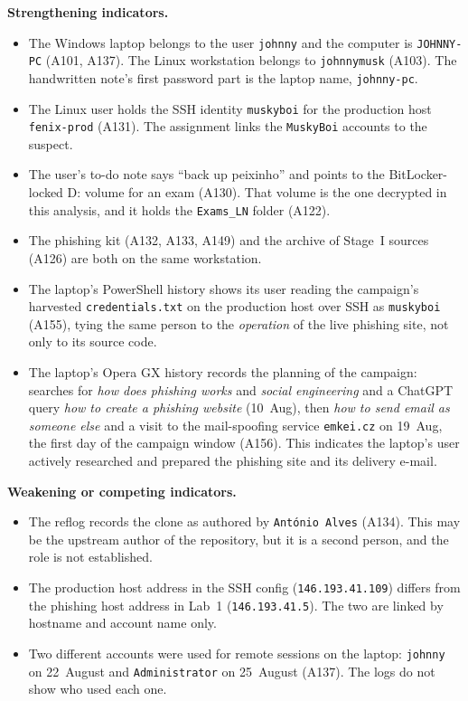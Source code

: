 \documentclass[11pt,a4paper,final,oneside]{article}
\begin{document}
\textbf{Strengthening indicators.}
\begin{itemize}
  \item The Windows laptop belongs to the user \texttt{johnny} and the computer is \texttt{JOHNNY-PC} (A101, A137). The Linux workstation belongs to \texttt{johnnymusk} (A103). The handwritten note's first password part is the laptop name, \texttt{johnny-pc}.
  \item The Linux user holds the SSH identity \texttt{muskyboi} for the production host \texttt{fenix-prod} (A131). The assignment links the \texttt{MuskyBoi} accounts to the suspect.
  \item The user's to-do note says ``back up peixinho'' and points to the BitLocker-locked D: volume for an exam (A130). That volume is the one decrypted in this analysis, and it holds the \texttt{Exams\_LN} folder (A122).
  \item The phishing kit (A132, A133, A149) and the archive of Stage~I sources (A126) are both on the same workstation.
  \item The laptop's PowerShell history shows its user reading the campaign's harvested \texttt{credentials.txt} on the production host over SSH as \texttt{muskyboi} (A155), tying the same person to the \emph{operation} of the live phishing site, not only to its source code.
  \item The laptop's Opera GX history records the planning of the campaign: searches for \textit{how does phishing works} and \textit{social engineering} and a ChatGPT query \textit{how to create a phishing website} (10~Aug), then \textit{how to send email as someone else} and a visit to the mail-spoofing service \texttt{emkei.cz} on 19~Aug, the first day of the campaign window (A156). This indicates the laptop's user actively researched and prepared the phishing site and its delivery e-mail.
\end{itemize}

\textbf{Weakening or competing indicators.}
\begin{itemize}
  \item The reflog records the clone as authored by \texttt{António Alves} (A134). This may be the upstream author of the repository, but it is a second person, and the role is not established.
  \item The production host address in the SSH config (\texttt{146.193.41.109}) differs from the phishing host address in Lab~1 (\texttt{146.193.41.5}). The two are linked by hostname and account name only.
  \item Two different accounts were used for remote sessions on the laptop: \texttt{johnny} on 22~August and \texttt{Administrator} on 25~August (A137). The logs do not show who used each one.
\end{itemize}
\end{document}
